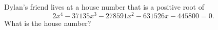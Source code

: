Dylan's friend lives at a house number that is a positive root of
\[
2x^4-37135x^3-278591x^2-631526x-445800=0 .
\]
What is the house number?
